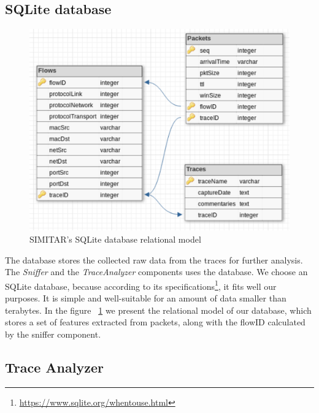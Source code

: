 \subsection{SQLite database}

\begin{figure}[ht!]
        \centering
        \includegraphics[width=\linewidth]{figures/database-relational-model}
        \caption{SIMITAR's SQLite database relational model}
    \label{fig:simitar-database}
\end{figure}


The database stores the collected raw data from the traces for further analysis. The \textit{Sniffer} and the \textit{TraceAnalyzer} components uses the database.  We choose an SQLite database, because according to its specifications\footnote{\href{https://www.sqlite.org/whentouse.html}{https://www.sqlite.org/whentouse.html}}, it fits well our purposes. It is simple and well-suitable for an amount of data smaller than terabytes. In the figure ~\ref{fig:simitar-database} we present the relational model of our database, which stores a set of features extracted from packets, along with the flowID calculated by the sniffer component. 


\subsection{Trace Analyzer}


